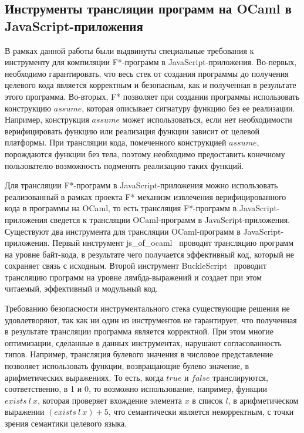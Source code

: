 \documentclass[12pt]{matmex-diploma}
\begin{document}
\subsection{Инструменты трансляции программ на OCaml в JavaScript-приложения}

В рамках данной работы были выдвинуты специальные требования к инструменту для компиляции F*-программ в JavaScript-приложения. Во-первых, необходимо гарантировать, что весь стек от создания программы до получения целевого кода является корректным и безопасным, как и полученная в результате этого программа. Во-вторых, F* позволяет при создании программы использовать конструкцию $assume$, которая описывает сигнатуру функцию без ее реализации. Например, конструкция $assume$ может использоваться, если нет необходимости верифицировать функцию или реализация функции зависит от целевой платформы. При трансляции кода, помеченного конструкцией $assume$, порождаются функции без тела, поэтому необходимо предоставить конечному пользователю возможность подменять реализацию таких функций.

Для трансляции F*-программ в JavaScript-приложения можно использовать реализованный в рамках проекта F* механизм извлечения верифицированного кода в программы на OCaml, то есть трансляция F*-программ в JavaScript-приложения сведется к трансляции OCaml-программ в JavaScript-приложения. Существуют два инструмента для трансляции OCaml-программ в JavaScript-приложения. Первый инструмент js\_of\_ocaml~\cite{ocamljs} проводит трансляцию программ на уровне байт-кода, в результате чего получается эффективный код, который не сохраняет связь с исходным. Второй инструмент BuckleScript~\cite{bucklescript} проводит трансляцию программ на уровне лямбда-выражений и создает при этом читаемый, эффективный и модульный код.

Требованию безопасности инструментального стека существующие решения не удовлетворяют, так как ни один из инструментов не гарантирует, что полученная в результате трансляции программа является корректной. При этом многие оптимизации, сделанные в данных инструментах, нарушают согласованность типов. Например, трансляция булевого значения в числовое представление позволяет использовать функции, возвращающие булево значение, в арифметических выражениях. То есть, когда $true$ и $false$ транслируются, соответственно, в 1 и 0, то  возможно использование, например, функции $exists~l~x$, которая проверяет вхождение элемента $x$ в список $l$, в арифметическом выражении $(exists~l~x) + 5$, что семантически является некорректным, с точки зрения семантики целевого языка. 
\end{document}
